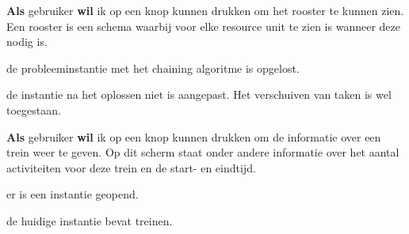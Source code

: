\nextUserStory
\textbf{Als} gebruiker \textbf{wil} ik op een knop kunnen drukken om het rooster te kunnen zien. Een rooster is een schema waarbij voor elke resource unit te zien is wanneer deze nodig is. 
\beginGegeven
    \item de probleeminstantie met het chaining algoritme is opgelost.
    \item de instantie na het oplossen niet is aangepast. Het verschuiven van taken is wel toegestaan. 
\endGegeven

\newpage

\nextUserStory
\textbf{Als} gebruiker \textbf{wil} ik op een knop kunnen drukken om de informatie over een trein weer te geven. Op dit scherm staat onder andere informatie over het aantal activiteiten voor deze trein en de start- en eindtijd. 
\beginGegeven
    \item er is een instantie geopend.
    \item de huidige instantie bevat treinen.
\endGegeven
